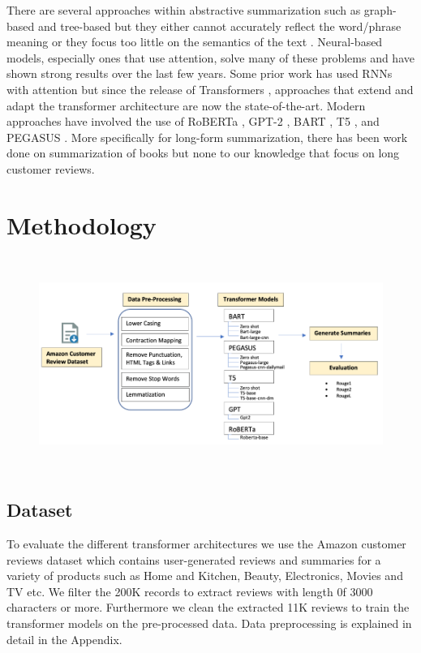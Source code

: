 \documentclass{article}
\begin{document}
There are several approaches within abstractive summarization such as graph-based and tree-based but they either cannot accurately reflect the word/phrase meaning or they focus too little on the semantics of the text \cite{kassasSurvey}. Neural-based models, especially ones that use attention, solve many of these problems and have shown strong results over the last few years\cite{sotaNeuralSurvey,suleiman2020deep}. Some prior work has used RNNs with attention  \cite{seq2seq} but since the release of Transformers \cite{vaswani2017attention}, approaches that extend and adapt the transformer architecture are now the state-of-the-art. Modern approaches have involved the use of RoBERTa \cite{originalRoBerta}, GPT-2 \cite{gpt2ForSummarization}, BART \cite{bart,newsSummarization}, T5 \cite{t5abstractive}, and PEGASUS \cite{pegasus}. More specifically for long-form summarization, there has been work done on summarization of books \cite{booksum} but none to our knowledge that focus on long customer reviews.

\section{Methodology}
\begin{figure}[h]
    \includegraphics[width=14cm, height=7cm]{workflow.png}
\label{Fig 1. Summarization process workflow}
\end{figure}

\subsection{Dataset}
To evaluate the different transformer architectures we use the Amazon customer reviews dataset \cite{amazonDataset1, amazonDataset2} which contains user-generated reviews and summaries for a variety of products such as Home and Kitchen, Beauty, Electronics, Movies and TV etc. We filter the 200K records to extract reviews with length 0f 3000 characters or more. Furthermore we clean the extracted 11K reviews to train the transformer models on the pre-processed data. Data preprocessing is explained in detail in the Appendix. 
\end{document}
